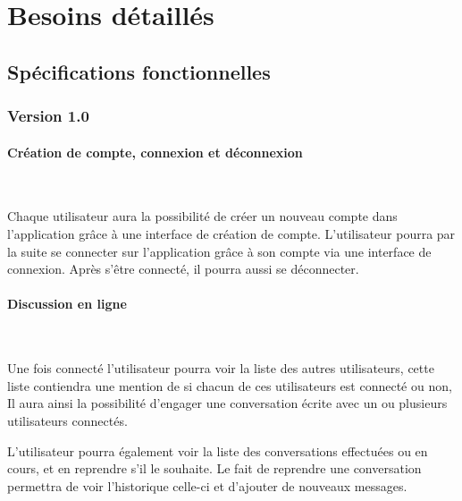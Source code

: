 \section{Besoins détaillés}

\subsection{Spécifications fonctionnelles}

\subsubsection{Version 1.0}

\paragraph{Création de compte, connexion et déconnexion} \\

\par Chaque utilisateur aura la possibilité de créer un nouveau compte dans l’application grâce à une interface de création de compte. L’utilisateur pourra par la suite se connecter sur l’application grâce à son compte via une interface de connexion. Après s'être connecté, il pourra aussi se déconnecter. 


\paragraph{Discussion en ligne} \\

\par Une fois connecté l'utilisateur pourra voir la liste des autres utilisateurs, cette liste contiendra une mention de si chacun de ces utilisateurs est connecté ou non, Il aura ainsi la possibilité d’engager une conversation écrite avec un ou plusieurs utilisateurs connectés. 

\par L’utilisateur pourra également voir la liste des conversations effectuées ou en cours, et en reprendre s'il le souhaite. Le fait de reprendre une conversation permettra de voir l’historique celle-ci et d’ajouter de nouveaux messages. 


